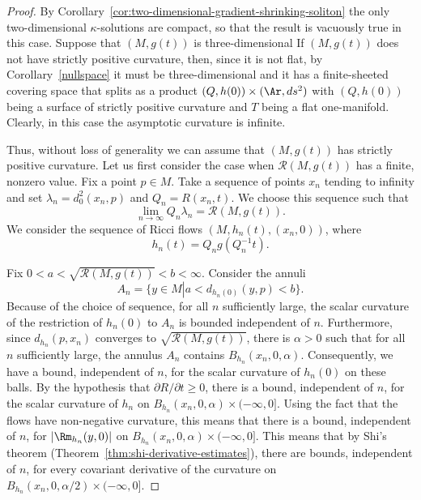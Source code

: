 \begin{proof}
By Corollary~\ref{cor:two-dimensional-gradient-shrinking-soliton} the only two-dimensional $\kappa$-solutions are
compact, so that the result is vacuously true in this case. Suppose that
$(M,g(t))$ is three-dimensional
 If $(M,g(t))$ does
not have strictly positive curvature, then, since it is not flat, by
Corollary~\ref{nullspace} it must be three-dimensional and it has a
finite-sheeted covering space that splits as a product $(Q,h(0))\times
(\Ar,ds^2)$ with $(Q,h(0))$ being a surface of strictly positive curvature and
$T$ being a flat one-manifold. Clearly, in this case the asymptotic curvature
is infinite.

Thus, without loss of generality we can assume that $(M,g(t))$ has
strictly positive curvature. Let us first consider the case when
${\mathcal R}(M,g(t))$ has a finite, nonzero value. Fix a point
$p\in M$. Take a sequence of points $x_n$ tending to infinity and
set $\lambda_n=d^2_0(x_n,p)$ and $Q_n=R(x_n,t)$. We choose this
sequence such that
$$\lim_{n\rightarrow\infty}Q_n\lambda_n={\mathcal R}(M,g(t)).$$
We consider the sequence of Ricci flows $(M,h_n(t),(x_n,0))$, where
$$h_n(t)=Q_ng(Q_n^{-1}t).$$

 Fix $0<a<\sqrt{{\mathcal R}(M,g(t))}<b<\infty$. Consider  the annuli
$$A_n=\{y\in M\left|\right. a<d_{h_n(0)}(y,p)<b\}.$$
Because of the choice of sequence, for all $n$ sufficiently large,
the scalar curvature of the restriction of $h_n(0)$ to $A_n$ is
bounded independent of $n$. Furthermore, since $d_{h_n}(p,x_n)$
converges to $\sqrt{{\mathcal R}(M,g(t))}$, there is $\alpha>0$ such
that for all $n$ sufficiently large, the annulus $A_n$ contains
$B_{h_n}(x_n,0,\alpha)$. Consequently, we have a bound, independent
of $n$, for the scalar curvature of $h_n(0)$ on these balls. By the
hypothesis that $\partial R/\partial t\ge 0$, there is a bound,
independent of $n$, for the scalar curvature of $h_n$ on
$B_{h_n}(x_n,0,\alpha)\times (-\infty,0]$. Using the fact that the
flows have non-negative curvature, this means that there is a bound,
independent of $n$, for $|\Rm_{h_n}(y,0)|$ on
$B_{h_n}(x_n,0,\alpha)\times (-\infty,0]$.
 This means
that by Shi's theorem (Theorem~\ref{thm:shi-derivative-estimates}), there are bounds,
independent of $n$, for every covariant derivative of the curvature
on $B_{h_n}(x_n,0,\alpha/2)\times (-\infty,0]$.


\end{proof}
